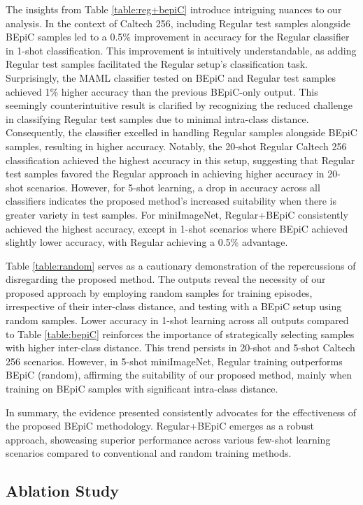 The insights from Table \ref{table:reg+bepiC} introduce intriguing nuances to our analysis. In the context of Caltech 256, including Regular test samples alongside BEpiC samples led to a 0.5\% improvement in accuracy for the Regular classifier in 1-shot classification. This improvement is intuitively understandable, as adding Regular test samples facilitated the Regular setup's classification task. Surprisingly, the MAML classifier tested on BEpiC and Regular test samples achieved 1\% higher accuracy than the previous BEpiC-only output. This seemingly counterintuitive result is clarified by recognizing the reduced challenge in classifying Regular test samples due to minimal intra-class distance. Consequently, the classifier excelled in handling Regular samples alongside BEpiC samples, resulting in higher accuracy. Notably, the 20-shot Regular Caltech 256 classification achieved the highest accuracy in this setup, suggesting that Regular test samples favored the Regular approach in achieving higher accuracy in 20-shot scenarios. However, for 5-shot learning, a drop in accuracy across all classifiers indicates the proposed method's increased suitability when there is greater variety in test samples. For miniImageNet, Regular+BEpiC consistently achieved the highest accuracy, except in 1-shot scenarios where BEpiC achieved slightly lower accuracy, with Regular achieving a 0.5\% advantage.

Table \ref{table:random} serves as a cautionary demonstration of the repercussions of disregarding the proposed method. The outputs reveal the necessity of our proposed approach by employing random samples for training episodes, irrespective of their inter-class distance, and testing with a BEpiC setup using random samples. Lower accuracy in 1-shot learning across all outputs compared to Table \ref{table:bepiC} reinforces the importance of strategically selecting samples with higher inter-class distance. This trend persists in 20-shot and 5-shot Caltech 256 scenarios. However, in 5-shot miniImageNet, Regular training outperforms BEpiC (random), affirming the suitability of our proposed method, mainly when training on BEpiC samples with significant intra-class distance.

In summary, the evidence presented consistently advocates for the effectiveness of the proposed BEpiC methodology. Regular+BEpiC emerges as a robust approach, showcasing superior performance across various few-shot learning scenarios compared to conventional and random training methods.

\subsection{Ablation Study}

